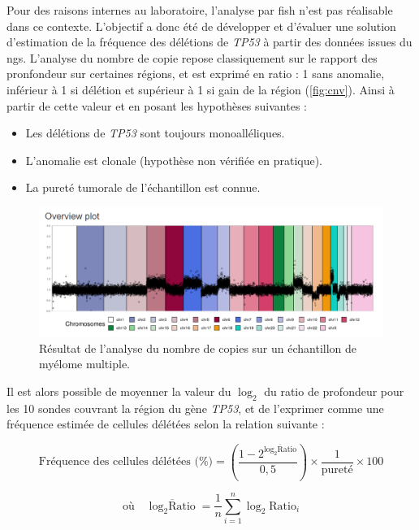 Pour des raisons internes au laboratoire, l'analyse par \gls{fish} n'est pas réalisable dans ce contexte.  
L'objectif a donc été de développer et d'évaluer une solution d'estimation de la fréquence des délétions de \textit{TP53} à partir des données issues du \gls{ngs}. 
L'analyse du nombre de copie repose classiquement sur le rapport des pronfondeur sur certaines régions, et est exprimé en ratio : 1 sans anomalie, inférieur à 1 si délétion 
et supérieur à 1 si gain de la région (\autoref{fig:cnv}). Ainsi à partir de cette valeur et en posant les hypothèses suivantes :

\begin{itemize}
    \item Les délétions de \textit{TP53} sont toujours monoalléliques.
    \item L'anomalie est clonale (hypothèse non vérifiée en pratique).
    \item La pureté tumorale de l'échantillon est connue.
\end{itemize}

\begin{figure}[H]
    \centering
    \includegraphics[width=1\textwidth]{images/cnv.png}
    \caption{Résultat de l'analyse du nombre de copies sur un échantillon de myélome multiple.}
    \label{fig:cnv}
\end{figure}

Il est alors possible de moyenner la valeur du $\log_2$ du ratio de profondeur pour les 10 sondes couvrant la région du gène \textit{TP53},  
et de l'exprimer comme une fréquence estimée de cellules délétées selon la relation suivante :

\begin{equation}
    \text{Fréquence des cellules délétées (\%)} = \left( \frac{1 -2^{\overline{\log_2\text{Ratio}}}}{0{,}5} \right) 
    \times \frac{1}{\text{pureté}} \times 100
\end{equation}

\begin{equation}
    \text{où} \quad \overline{\log_2\text{Ratio}} = \frac{1}{n} \sum_{i=1}^{n} \log_2\text{Ratio}_i
\end{equation}
    
